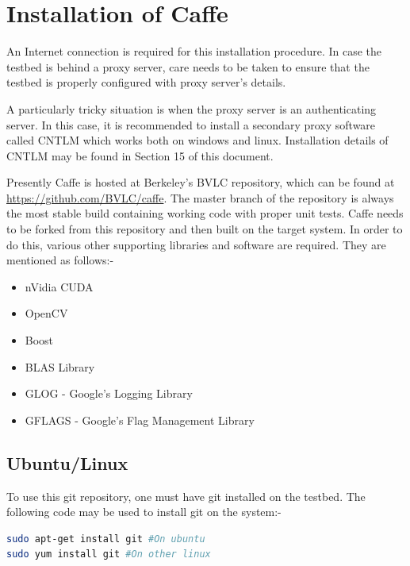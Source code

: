\documentclass{article}
\begin{document}
\section{Installation of Caffe}
An Internet connection is required for this installation procedure. In case the testbed is behind a proxy server, care needs to be taken to ensure that the testbed is properly configured with proxy server's details.
\par
A particularly tricky situation is when the proxy server is an authenticating server. In this case, it is recommended to install a secondary proxy software called CNTLM \cite{cntlm} which works both on windows and linux. Installation details of CNTLM may be found in Section 15 of this document.\\
\par
Presently Caffe is hosted at Berkeley's BVLC repository, which can be found at \url{https://github.com/BVLC/caffe}. The master branch of the repository is always the most stable build containing working code with proper unit tests. Caffe needs to be forked from this repository and then built on the target system. In order to do this, various other supporting libraries and software are required. They are mentioned as follows:-
\begin{itemize}
	\item nVidia CUDA
	\item OpenCV
	\item Boost
	\item BLAS Library
	\item GLOG - Google's Logging Library
	\item GFLAGS - Google's Flag Management Library
\end{itemize} 
\subsection{Ubuntu/Linux}
To use this git repository, one must have git installed on the testbed. The following code may be used to install git on the system:-
\begin{lstlisting}[tabsize=4,language=bash]
sudo apt-get install git #On ubuntu
sudo yum install git #On other linux
\end{lstlisting}
\end{document}
